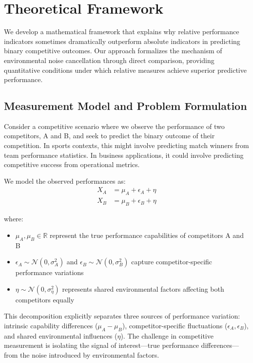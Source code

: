 \section{Theoretical Framework}

We develop a mathematical framework that explains why relative performance indicators sometimes dramatically outperform absolute indicators in predicting binary competitive outcomes. Our approach formalizes the mechanism of environmental noise cancellation through direct comparison, providing quantitative conditions under which relative measures achieve superior predictive performance.

\subsection{Measurement Model and Problem Formulation}

Consider a competitive scenario where we observe the performance of two competitors, A and B, and seek to predict the binary outcome of their competition. In sports contexts, this might involve predicting match winners from team performance statistics. In business applications, it could involve predicting competitive success from operational metrics.

We model the observed performances as:
\begin{align}
X_A &= \mu_A + \epsilon_A + \eta \label{eq:model_a} \\
X_B &= \mu_B + \epsilon_B + \eta \label{eq:model_b}
\end{align}

where:
\begin{itemize}
    \item $\mu_A, \mu_B \in \mathbb{R}$ represent the true performance capabilities of competitors A and B
    \item $\epsilon_A \sim \mathcal{N}(0, \sigma_A^2)$ and $\epsilon_B \sim \mathcal{N}(0, \sigma_B^2)$ capture competitor-specific performance variations
    \item $\eta \sim \mathcal{N}(0, \sigma_\eta^2)$ represents shared environmental factors affecting both competitors equally
\end{itemize}

This decomposition explicitly separates three sources of performance variation: intrinsic capability differences ($\mu_A - \mu_B$), competitor-specific fluctuations ($\epsilon_A, \epsilon_B$), and shared environmental influences ($\eta$). The challenge in competitive measurement is isolating the signal of interest—true performance differences—from the noise introduced by environmental factors.

